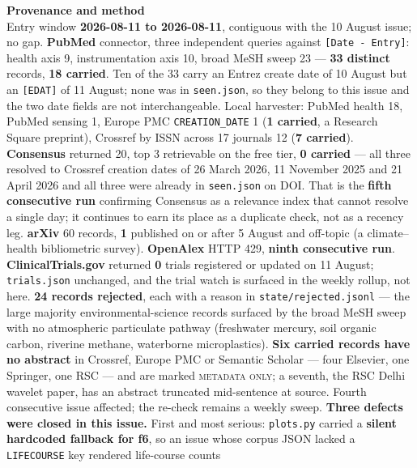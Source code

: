 \documentclass[10pt]{article}
\begin{document}
\vspace{4mm}
\begin{keybox}
{\sffamily\bfseries\footnotesize\color{Deep}Provenance and method}\\[1.2mm]
{\fontsize{7.2}{8.8}\selectfont
Entry window \textbf{2026-08-11 to 2026-08-11}, contiguous with the 10 August issue; no
gap. \textbf{PubMed} connector, three independent queries against \texttt{[Date - Entry]}:
health axis 9, instrumentation axis 10, broad MeSH sweep 23 --- \textbf{33 distinct}
records, \textbf{18 carried}. Ten of the 33 carry an Entrez create date of 10 August but
an \texttt{[EDAT]} of 11 August; none was in \texttt{seen.json}, so they belong to this
issue and the two date fields are not interchangeable. Local harvester: PubMed health 18,
PubMed sensing 1, Europe PMC \texttt{CREATION\_DATE} 1 (\textbf{1 carried}, a Research
Square preprint), Crossref by ISSN across 17 journals 12 (\textbf{7 carried}).
\textbf{Consensus} returned 20, top 3 retrievable on the free tier, \textbf{0 carried} ---
all three resolved to Crossref creation dates of 26 March 2026, 11 November 2025 and
21 April 2026 and all three were already in \texttt{seen.json} on DOI. That is the
\textbf{fifth consecutive run} confirming Consensus as a relevance index that cannot
resolve a single day; it continues to earn its place as a duplicate check, not as a
recency leg. \textbf{arXiv} 60 records, \textbf{1} published on or after 5 August and
off-topic (a climate--health bibliometric survey). \textbf{OpenAlex} HTTP 429,
\textbf{ninth consecutive run}. \textbf{ClinicalTrials.gov} returned \textbf{0} trials
registered or updated on 11 August; \texttt{trials.json} unchanged, and the trial watch is
surfaced in the weekly rollup, not here. \textbf{24 records rejected}, each with a reason
in \texttt{state/rejected.jsonl} --- the large majority environmental-science records
surfaced by the broad MeSH sweep with no atmospheric particulate pathway (freshwater
mercury, soil organic carbon, riverine methane, waterborne microplastics).
\textbf{Six carried records have no abstract} in Crossref, Europe PMC or Semantic
Scholar --- four Elsevier, one Springer, one RSC --- and are marked \textsc{metadata
only}; a seventh, the RSC Delhi wavelet paper, has an abstract truncated mid-sentence at
source. Fourth consecutive issue affected; the re-check remains a weekly sweep.
\textbf{Three defects were closed in this issue.} First and most serious:
\texttt{plots.py} carried a \textbf{silent hardcoded fallback for f6}, so an issue whose
corpus JSON lacked a \texttt{LIFECOURSE} key rendered life-course counts
}
\end{keybox}
\end{document}
